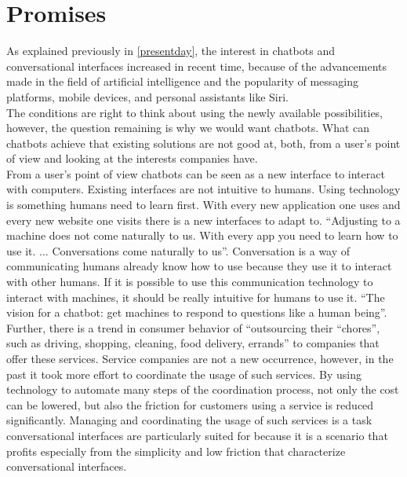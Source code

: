 \section{Promises}


As explained previously in \ref{presentday}, the interest in chatbots and conversational interfaces increased in recent time, because of the advancements made in the field of artificial intelligence and the popularity of messaging platforms, mobile devices, and personal assistants like Siri.
\\
The conditions are right to think about using the newly available possibilities, however, the question remaining is why we would want chatbots. What can chatbots achieve that existing solutions are not good at, both, from a user's point of view and looking at the interests companies have.
\\

From a user's point of view chatbots can be seen as a new interface to interact with computers.
Existing interfaces are not intuitive to humans. Using technology is something humans need to learn first.
With every new application one uses and every new website one visits there is a new interfaces to adapt to.
``Adjusting to a machine does not come naturally to us. With every app you need to learn how to use it. ... Conversations come naturally to us''\cite{techinasia}.
Conversation is a way of communicating humans already know how to use because they use it to interact with other humans.
If it is possible to use this communication technology to interact with machines, it should be really intuitive for humans to use it.
``The vision for a chatbot: get machines to respond to questions like a human being''\cite{techinasia}.
\\

Further, there is a trend in consumer behavior of ``outsourcing their “chores”, such as driving, shopping, cleaning, food delivery, errands''\cite{chatbotbook} to companies that offer these services.
Service companies are not a new occurrence, however, in the past it took more effort to coordinate the usage of such services.
By using technology to automate many steps of the coordination process, not only the cost can be lowered, but also the friction for customers using a service is reduced significantly.
Managing and coordinating the usage of such services is a task conversational interfaces are particularly suited for because it is a scenario that profits especially from the simplicity and low friction that characterize conversational interfaces.
\\

